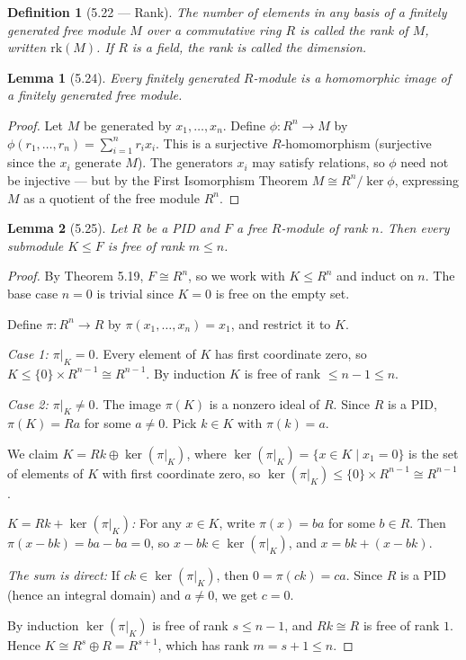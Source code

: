 \documentclass[12pt]{article}
\newtheorem{lemma}{Lemma}
\newtheorem{definition}{Definition}
\begin{document}
\begin{definition}[5.22 — Rank]
The number of elements in any basis of a finitely generated free module $M$ over a commutative ring $R$ is called the \emph{rank} of $M$, written $\mathrm{rk}(M)$. If $R$ is a field, the rank is called the \emph{dimension}.
\end{definition}

\begin{lemma}[5.24]
Every finitely generated $R$-module is a homomorphic image of a finitely generated free module.
\end{lemma}

\begin{proof}
Let $M$ be generated by $x_1, \ldots, x_n$. Define $\phi : R^n \to M$ by $\phi(r_1, \ldots, r_n) = \sum_{i=1}^n r_i x_i$. This is a surjective $R$-homomorphism (surjective since the $x_i$ generate $M$). The generators $x_i$ may satisfy relations, so $\phi$ need not be injective — but by the First Isomorphism Theorem $M \cong R^n / \ker\phi$, expressing $M$ as a quotient of the free module $R^n$.
\end{proof}

\begin{lemma}[5.25]
Let $R$ be a PID and $F$ a free $R$-module of rank $n$. Then every submodule $K \leq F$ is free of rank $m \leq n$.
\end{lemma}

\begin{proof}
By Theorem 5.19, $F \cong R^n$, so we work with $K \leq R^n$ and induct on $n$. The base case $n = 0$ is trivial since $K = 0$ is free on the empty set.

Define $\pi : R^n \to R$ by $\pi(x_1, \ldots, x_n) = x_1$, and restrict it to $K$.

\textit{Case 1: $\pi|_K = 0$.} Every element of $K$ has first coordinate zero, so $K \leq \{0\} \times R^{n-1} \cong R^{n-1}$. By induction $K$ is free of rank $\leq n-1 \leq n$.

\textit{Case 2: $\pi|_K \neq 0$.} The image $\pi(K)$ is a nonzero ideal of $R$. Since $R$ is a PID, $\pi(K) = Ra$ for some $a \neq 0$. Pick $k \in K$ with $\pi(k) = a$.

We claim $K = Rk \oplus \ker(\pi|_K)$, where $\ker(\pi|_K) = \{x \in K \mid x_1 = 0\}$ is the set of elements of $K$ with first coordinate zero, so $\ker(\pi|_K) \leq \{0\} \times R^{n-1} \cong R^{n-1}$.

\textit{$K = Rk + \ker(\pi|_K)$:} For any $x \in K$, write $\pi(x) = ba$ for some $b \in R$. Then $\pi(x - bk) = ba - ba = 0$, so $x - bk \in \ker(\pi|_K)$, and $x = bk + (x - bk)$.

\textit{The sum is direct:} If $ck \in \ker(\pi|_K)$, then $0 = \pi(ck) = ca$. Since $R$ is a PID (hence an integral domain) and $a \neq 0$, we get $c = 0$.

By induction $\ker(\pi|_K)$ is free of rank $s \leq n-1$, and $Rk \cong R$ is free of rank $1$. Hence $K \cong R^s \oplus R = R^{s+1}$, which has rank $m = s+1 \leq n$.
\end{proof}
\end{document}
